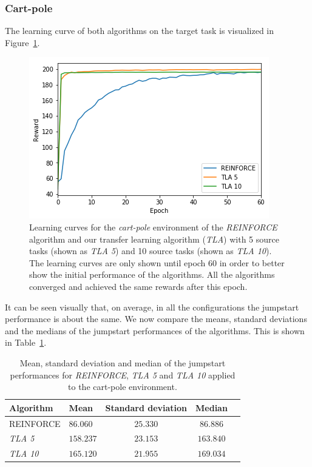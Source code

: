 \subsubsection{Cart-pole} %
\label{ssub:without_sparse_representation_transfer:cartpole}
The learning curve of both algorithms on the target task is visualized in Figure~\ref{fig:CartPole:reward_target_re-akt5-akt10}.
\begin{figure}[htb]
    \centering
    \includegraphics[width=.8\linewidth]{images/results/CartPole/no_sparse_transfer/reward_target_re-akt5-akt10.png}
    \caption[Learning curves for \textit{REINFORCE} and \textit{TLA} for the \emph{Cart-pole} environment]{Learning curves for the \textit{cart-pole} environment of the \textit{REINFORCE} algorithm and our transfer learning algorithm (\textit{TLA}) with 5 source tasks (shown as \textit{TLA 5}) and 10 source tasks (shown as \textit{TLA 10}). The learning curves are only shown until epoch 60 in order to better show the initial performance of the algorithms. All the algorithms converged and achieved the same rewards after this epoch.}
    \label{fig:CartPole:reward_target_re-akt5-akt10}
\end{figure}
It can be seen visually that, on average, in all the configurations the jumpstart performance is about the same. We now compare the means, standard deviations and the medians of the jumpstart performances of the algorithms. This is shown in Table~\ref{tab:cartpole:nosparse:stats}.
\begin{table}[htb]
    \centering
    \begin{tabular}{llccc}
    \hline
    Algorithm & Mean & Standard deviation & Median \\
    \hline
       REINFORCE  & $86.060$ & $25.330$ & $86.886$ \\
       \textit{TLA 5} & $158.237$ & $23.153$ & $163.840$ \\
       \textit{TLA 10} & $\bm{165.120}$ & $\bm{21.955}$ & $\bm{169.034}$ \\
    \hline
    \end{tabular}
    \caption{Mean, standard deviation and median of the jumpstart performances for \textit{REINFORCE}, \textit{TLA 5} and \textit{TLA 10} applied to the cart-pole environment.}
    \label{tab:cartpole:nosparse:stats}
\end{table}
